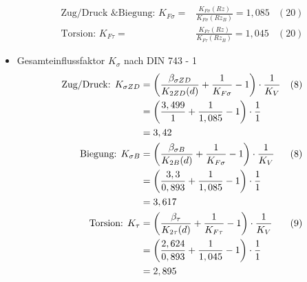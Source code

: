 \begin{itemize}
\begin{align*}
	\text{Zug/Druck \& Biegung: } K_{F\sigma} =&\frac{K_{F\sigma} (Rz)}{K_{F\sigma} (Rz_B)} = 1,085 &(20) \\
	\text{Torsion: } K_{F\tau} = &\frac{K_{F\tau} (Rz)}{K_{F\tau} (Rz_B)} = 1,045 &(20)
	\end{align*}
\item Gesamteinflussfaktor $K_{\sigma}$ nach DIN 743 - 1
	\begin{align*}
	\text{Zug/Druck: } K_{\sigma ZD} &= \left( \frac{\beta_{\sigma ZD}}{K_{2ZD} (d)} + \frac{1}{K_{F\sigma}} -1\right) \cdot \frac{1}{K_V} & (8) \\
	&= \left( \frac{3,499}{1} + \frac{1}{1,085} -1\right) \cdot \frac{1}{1} \\
	&= 3,42 \\
	\text{Biegung: } K_{\sigma B} &= \left( \frac{\beta_{\sigma B}}{K_{2B}(d)} + \frac{1}{K_{F\sigma}} -1\right) \cdot \frac{1}{K_V} & (8) \\
	&= \left( \frac{3,3}{0,893} + \frac{1}{1,085} -1\right) \cdot \frac{1}{1} \\
	&= 3,617 \\
	\text{Torsion: } K_{\tau} &= \left( \frac{\beta_{\tau}}{K_{2\tau}(d)} + \frac{1}{K_{F\tau}} -1\right) \cdot \frac{1}{K_V} & (9) \\
	&= \left( \frac{2,624}{0,893} + \frac{1}{1,045} -1\right) \cdot \frac{1}{1} \\
	&= 2,895 
	\end{align*}
\end{itemize}

